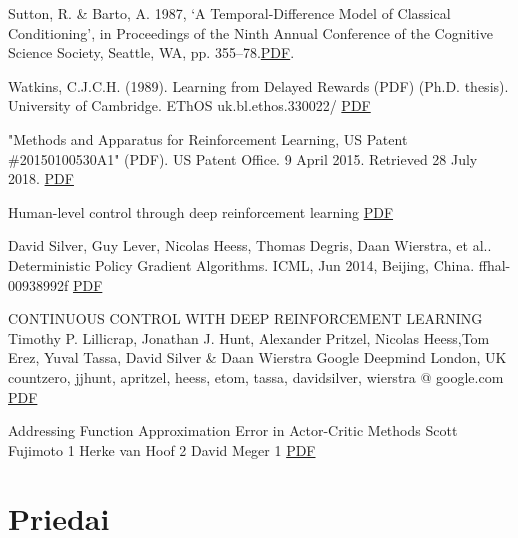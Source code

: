 \documentclass[a4paper, 12pt]{article}
\begin{document}
\begin{thebibliography}{99}

Sutton, R. \& Barto, A. 1987, ‘A Temporal-Difference Model of Classical Conditioning’, in Proceedings of the Ninth Annual Conference of the Cognitive Science Society, Seattle, WA, pp. 355–78.\href{http://incompleteideas.net/papers/sutton-barto-TD-87.pdf}{PDF}.

Watkins, C.J.C.H. (1989). Learning from Delayed Rewards (PDF) (Ph.D. thesis). University of Cambridge. EThOS uk.bl.ethos.330022/ \href{https://www.cs.rhul.ac.uk/~chrisw/new_thesis.pdf}{PDF}

 "Methods and Apparatus for Reinforcement Learning, US Patent \#20150100530A1" (PDF). US Patent Office. 9 April 2015. Retrieved 28 July 2018. \href{https://patentimages.storage.googleapis.com/71/91/4a/c5cf4ffa56f705/US20150100530A1.pdf}{PDF}

Human-level control through deep reinforcement learning \href{https://storage.googleapis.com/deepmind-media/dqn/DQNNaturePaper.pdf}{PDF}

David Silver, Guy Lever, Nicolas Heess, Thomas Degris, Daan Wierstra, et al.. Deterministic Policy
Gradient Algorithms. ICML, Jun 2014, Beijing, China. ffhal-00938992f \href{https://hal.inria.fr/file/index/docid/938992/filename/dpg-icml2014.pdf}{PDF}

CONTINUOUS CONTROL WITH DEEP REINFORCEMENT LEARNING
Timothy P. Lillicrap, Jonathan J. Hunt, Alexander Pritzel, Nicolas Heess,Tom Erez, Yuval Tassa, David Silver \& Daan Wierstra
Google Deepmind
London, UK
{countzero, jjhunt, apritzel, heess, etom, tassa, davidsilver, wierstra} @ google.com
\href{https://arxiv.org/pdf/1509.02971.pdf}{PDF}

Addressing Function Approximation Error in Actor-Critic Methods
Scott Fujimoto 1 Herke van Hoof 2 David Meger 1
\href{https://arxiv.org/pdf/1802.09477.pdf}{PDF}





\end{thebibliography}
%
%
\newpage
\appendix
\section{Priedai}
\end{document}
